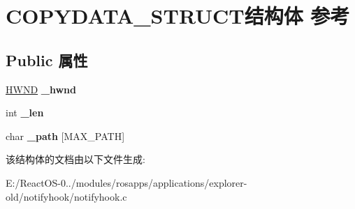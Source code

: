 \hypertarget{struct_c_o_p_y_d_a_t_a___s_t_r_u_c_t}{}\section{C\+O\+P\+Y\+D\+A\+T\+A\+\_\+\+S\+T\+R\+U\+C\+T结构体 参考}
\label{struct_c_o_p_y_d_a_t_a___s_t_r_u_c_t}
\subsection*{Public 属性}
\begin{DoxyCompactItemize}
\item 
\mbox{\label{struct_c_o_p_y_d_a_t_a___s_t_r_u_c_t_ac3237d636bf16580d557610e5ab92e1b}} 
\hyperlink{interfacevoid}{H\+W\+ND} {\bfseries \+\_\+hwnd}
\item 
\mbox{\label{struct_c_o_p_y_d_a_t_a___s_t_r_u_c_t_a517d2a95b34a03ed4c7b23ea68be6a70}} 
int {\bfseries \+\_\+len}
\item 
\mbox{\label{struct_c_o_p_y_d_a_t_a___s_t_r_u_c_t_abdf14966e11e288c99309186a13c1430}} 
char {\bfseries \+\_\+path} \mbox{[}M\+A\+X\+\_\+\+P\+A\+TH\mbox{]}
\end{DoxyCompactItemize}


该结构体的文档由以下文件生成\+:\begin{DoxyCompactItemize}
\item 
E\+:/\+React\+O\+S-\/0../modules/rosapps/applications/explorer-\/old/notifyhook/notifyhook.\+c\end{DoxyCompactItemize}

